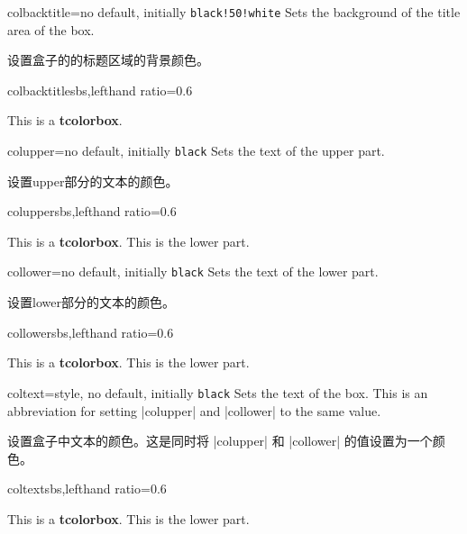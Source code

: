 \begin{docTcbKey}{colbacktitle}{=}{no default, initially \texttt{black!50!white}}
Sets the background  of the title area of the box.

设置盒子的的标题区域的背景颜色。
\begin{exdispExample*}{colbacktitle}{sbs,lefthand ratio=0.6}
\begin{tcolorbox}[colbacktitle=red!50!white,
title=My title,coltitle=black,
fonttitle=\bfseries]
This is a \textbf{tcolorbox}.
\end{tcolorbox}
\end{exdispExample*}
\end{docTcbKey}




\begin{docTcbKey}{colupper}{=}{no default, initially \texttt{black}}
Sets the text  of the upper part.

设置upper部分的文本的颜色。
\begin{exdispExample*}{colupper}{sbs,lefthand ratio=0.6}
\begin{tcolorbox}[colupper=red!75!black]
This is a \textbf{tcolorbox}.
\tcblower
This is the lower part.
\end{tcolorbox}
\end{exdispExample*}
\end{docTcbKey}


\begin{docTcbKey}{collower}{=}{no default, initially \texttt{black}}
Sets the text  of the lower part.

设置lower部分的文本的颜色。
\begin{exdispExample*}{collower}{sbs,lefthand ratio=0.6}
\begin{tcolorbox}[collower=red!75!black]
This is a \textbf{tcolorbox}.
\tcblower
This is the lower part.
\end{tcolorbox}
\end{exdispExample*}
\end{docTcbKey}


\begin{docTcbKey}{coltext}{=}{style, no default, initially \texttt{black}}
Sets the text  of the box. This is an abbreviation for setting
|colupper| and |collower| to the same value.

设置盒子中文本的颜色。这是同时将 |colupper| 和 |collower| 的值设置为一个颜色。
\begin{exdispExample*}{coltext}{sbs,lefthand ratio=0.6}
\begin{tcolorbox}[coltext=red!75!black]
This is a \textbf{tcolorbox}.
\tcblower
This is the lower part.
\end{tcolorbox}
\end{exdispExample*}
\end{docTcbKey}


